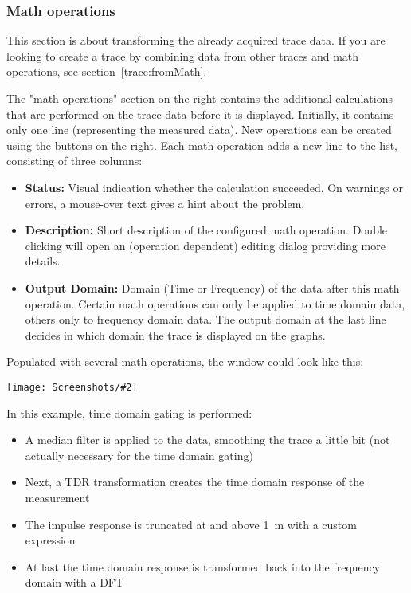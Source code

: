 \documentclass[a4paper,11pt]{article}
\newcommand\info[1][5ex]{%
  \renewcommand\stacktype{L}%
  \scaleto{\stackon[1.2pt]{\color{blue}$\bigcirc$}{\raisebox{-1.5pt}{\small i}}}{#1}%
}
\newenvironment{information}[1][]{%
   \begin{mdframed}[%
      backgroundcolor={blue!15}, hidealllines=true,
      skipabove=0.7\baselineskip, skipbelow=0.7\baselineskip,
      splitbottomskip=2pt, splittopskip=4pt, #1]%
   \makebox[0pt]{%
      \smash{%
         \hspace*{-45pt}%
         \raisebox{-5pt}{%
            {\info}%
         }%
      }%
   }%
}{\end{mdframed}}
\newcommand{\screenshot}[2]{\begin{center}
\texttt{[image: Screenshots/\#2]}
\end{center}}
\begin{document}
\subsubsection{Math operations}
\label{trace:math}
\begin{information}
This section is about transforming the already acquired trace data. If you are looking to create a trace by combining data from other traces and math operations, see section~\ref{trace:fromMath}.
\end{information}
The "math operations" section on the right contains the additional calculations that are performed on the trace data before it is displayed. Initially, it contains only one line (representing the measured data). New operations can be created using the buttons on the right. Each math operation adds a new line to the list, consisting of three columns:
\begin{itemize}
\item \textbf{Status:} Visual indication whether the calculation succeeded. On warnings or errors, a mouse-over text gives a hint about the problem.
\item \textbf{Description:} Short description of the configured math operation. Double clicking will open an (operation dependent) editing dialog providing more details.
\item \textbf{Output Domain:} Domain (Time or Frequency) of the data after this math operation. Certain math operations can only be applied to time domain data, others only to frequency domain data. The output domain at the last line decides in which domain the trace is displayed on the graphs.
\end{itemize}

Populated with several math operations, the window could look like this:
\screenshot{1.0}{TraceMath.png}
In this example, time domain gating is performed:
\begin{itemize}
\item A median filter is applied to the data, smoothing the trace a little bit (not actually necessary for the time domain gating)
\item Next, a TDR transformation creates the time domain response of the measurement
\item The impulse response is truncated at and above \SI{1}{\meter} with a custom expression
\item At last the time domain response is transformed back into the frequency domain with a DFT
\end{itemize}
\end{document}
